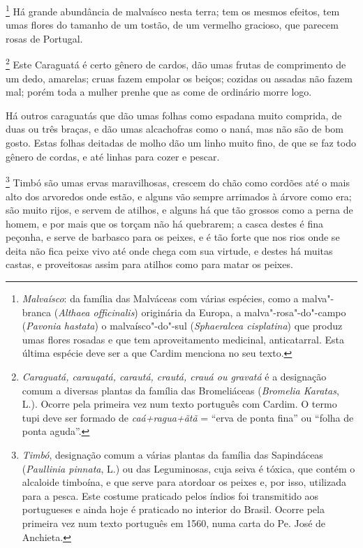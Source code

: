 \footnote{ \textit{Malvaísco}: da família das
Malváceas com várias espécies, como a malva"-branca (\textit{Althaea
officinalis}) originária da Europa, a malva"-rosa"-do"-campo 
(\textit{Pavonia hastata}) o malvaísco"-do"-sul (\textit{Sphaeralcea
cisplatina}) que produz umas flores rosadas e que tem aproveitamento
medicinal, anticatarral. Esta última espécie deve ser a que Cardim
menciona no seu texto.} Há grande abundância de malvaísco
nesta terra; tem os mesmos efeitos, tem umas flores do tamanho de um
tostão, de um vermelho gracioso, que parecem rosas de Portugal.

\footnote{ \textit{Caraguatá, carauqatá, carautá,
crautá, crauá ou gravatá} é a designação comum a diversas plantas da
família das Bromeliáceas (\textit{Bromelia Karatas}, L.). Ocorre pela
primeira vez num texto português com Cardim. O termo tupi deve ser
formado de \textit{caá+ragua+ãtã} = ``erva de ponta fina'' ou ``folha de
ponta aguda''.} Este Caraguatá é certo gênero de cardos,
dão umas frutas de comprimento de um dedo, amarelas; cruas fazem
empolar os beiços; cozidas ou assadas não fazem mal; porém toda a
mulher prenhe que as come de ordinário morre logo.

 Há outros caraguatás que dão umas folhas como espadana muito comprida,
de duas ou três braças, e dão umas alcachofras como o naná, mas não são
de bom gosto. Estas folhas deitadas de molho dão um linho muito fino,
de que se faz todo gênero de cordas, e até linhas para cozer e pescar. 

\footnote{ \textit{Timbó}, designação comum a várias
plantas da família das Sapindáceas (\textit{Paullinia pinnata}, L.) 
ou das Leguminosas, cuja seiva é tóxica, que contém o
alcaloide timboína, e que serve para atordoar os peixes e, por isso,
utilizada para a pesca. Este costume praticado pelos índios foi
transmitido aos portugueses e ainda hoje é praticado no interior do
Brasil. Ocorre pela primeira vez num texto português em 1560, numa
carta do Pe. José de Anchieta.} Timbó são umas
ervas maravilhosas, crescem do chão como cordões até o mais alto dos
arvoredos onde estão, e alguns vão sempre arrimados à árvore como era;
são muito rijos, e servem de atilhos, e alguns há que tão grossos como a
perna de homem, e por mais que os torçam não há quebrarem; a casca
destes é fina peçonha, e serve de barbasco para os peixes, e é tão
forte que nos rios onde se deita não fica peixe vivo até onde chega
com sua virtude, e destes há muitas castas, e proveitosas assim para
atilhos como para matar os peixes. 

